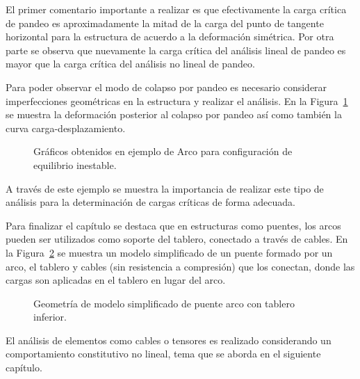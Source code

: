 El primer comentario importante a realizar es que efectivamente la carga crítica de pandeo es aproximadamente la mitad de la carga del punto de tangente horizontal para la estructura de acuerdo a la deformación simétrica. %
%
Por otra parte se observa que nuevamente la carga crítica del análisis lineal de pandeo es mayor que la carga crítica del análisis no lineal de pandeo.

Para poder observar el modo de colapso por pandeo es necesario considerar imperfecciones geométricas en la estructura y realizar el análisis. %
%
En la Figura~\ref{fig:arcopand} se muestra la deformación posterior al colapso por pandeo así como también la curva carga-desplazamiento.

\begin{figure}[htb]
	\centering
	\resizebox{.47\linewidth}{!}{}
	\resizebox{.47\linewidth}{!}{}
	\caption{Gráficos obtenidos en ejemplo de Arco para configuración de equilibrio inestable.}
	\label{fig:arcopand}
\end{figure}

A través de este ejemplo se muestra la importancia de realizar este tipo de análisis para la determinación de cargas críticas de forma adecuada.

Para finalizar el capítulo se destaca que en estructuras como puentes, los arcos pueden ser utilizados como soporte del tablero, conectado a través de cables. %
%
En la Figura~\ref{fig:arcobridge} se muestra un modelo simplificado de un puente formado por un arco, el tablero y cables (sin resistencia a compresión) que los conectan, donde las cargas son aplicadas en el tablero en lugar del arco. %
%
\begin{figure}[htb]
	\centering
	\resizebox{.55\linewidth}{!}{}
	\caption{Geometría de modelo simplificado de puente arco con tablero inferior.}
	\label{fig:arcobridge}
\end{figure}
%

El análisis de elementos como cables o tensores es realizado considerando un comportamiento constitutivo no lineal, tema que se aborda en el siguiente capítulo.











